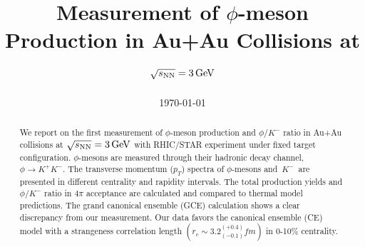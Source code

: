 \documentclass[%
 reprint,	
showpacs,
 amsmath,amssymb,
 aps,
 prc,
]{revtex4-1}
\begin{document}

\title{Measurement of $\phi$-meson Production in Au+Au Collisions at ${\sqrt{s_{\rm NN}} = \rm{3\,GeV}}$}%


\noaffiliation

\date{\today}%

\begin{abstract}


We report on the first measurement of $\phi$-meson production and $\phi/K^-$ ratio in Au+Au collisions at ${\sqrt{s_{\rm NN}} = \rm{3\,GeV}}$ with RHIC/STAR experiment under fixed target configuration. $\phi$-mesons are measured through their hadronic decay channel, $\phi\rightarrow K^+K^-$. The transverse momentum ($p_T$) spectra of $\phi$-mesons and $K^-$ are presented in different centrality and rapidity intervals. The total production yields and $\phi/K^-$ ratio in $4\pi$ acceptance are calculated and compared to thermal model predictions. The grand canonical ensemble (GCE) calculation shows a clear discrepancy from our measurement. Our data favors the canonical ensemble (CE) model with a strangeness correlation length $(r_c   \sim 3.2_(−0.1)^(+0.4) fm)$ in 0-10\% centrality.


\end{abstract}
\end{document}
